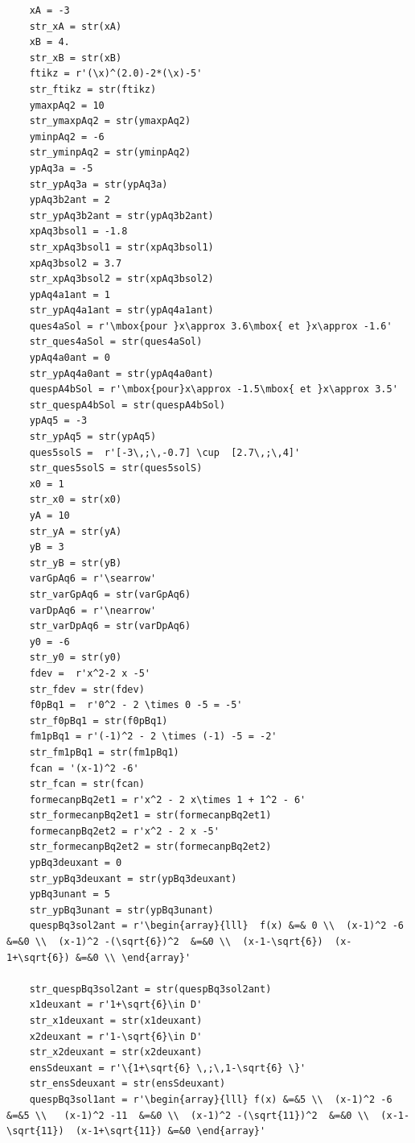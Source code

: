 {\begin{verbatim}
    xA = -3 
    str_xA = str(xA) 
    xB = 4. 
    str_xB = str(xB) 
    ftikz = r'(\x)^(2.0)-2*(\x)-5' 
    str_ftikz = str(ftikz) 
    ymaxpAq2 = 10 
    str_ymaxpAq2 = str(ymaxpAq2) 
    yminpAq2 = -6 
    str_yminpAq2 = str(yminpAq2) 
    ypAq3a = -5 
    str_ypAq3a = str(ypAq3a) 
    ypAq3b2ant = 2 
    str_ypAq3b2ant = str(ypAq3b2ant) 
    xpAq3bsol1 = -1.8 
    str_xpAq3bsol1 = str(xpAq3bsol1) 
    xpAq3bsol2 = 3.7 
    str_xpAq3bsol2 = str(xpAq3bsol2) 
    ypAq4a1ant = 1 
    str_ypAq4a1ant = str(ypAq4a1ant) 
    ques4aSol = r'\mbox{pour }x\approx 3.6\mbox{ et }x\approx -1.6' 
    str_ques4aSol = str(ques4aSol) 
    ypAq4a0ant = 0 
    str_ypAq4a0ant = str(ypAq4a0ant) 
    quespA4bSol = r'\mbox{pour}x\approx -1.5\mbox{ et }x\approx 3.5' 
    str_quespA4bSol = str(quespA4bSol) 
    ypAq5 = -3 
    str_ypAq5 = str(ypAq5) 
    ques5solS =  r'[-3\,;\,-0.7] \cup  [2.7\,;\,4]' 
    str_ques5solS = str(ques5solS) 
    x0 = 1 
    str_x0 = str(x0) 
    yA = 10 
    str_yA = str(yA) 
    yB = 3 
    str_yB = str(yB) 
    varGpAq6 = r'\searrow'
    str_varGpAq6 = str(varGpAq6) 
    varDpAq6 = r'\nearrow' 
    str_varDpAq6 = str(varDpAq6) 
    y0 = -6 
    str_y0 = str(y0) 
    fdev =  r'x^2-2 x -5' 
    str_fdev = str(fdev) 
    f0pBq1 =  r'0^2 - 2 \times 0 -5 = -5'  
    str_f0pBq1 = str(f0pBq1) 
    fm1pBq1 = r'(-1)^2 - 2 \times (-1) -5 = -2' 
    str_fm1pBq1 = str(fm1pBq1) 
    fcan = '(x-1)^2 -6' 
    str_fcan = str(fcan) 
    formecanpBq2et1 = r'x^2 - 2 x\times 1 + 1^2 - 6' 
    str_formecanpBq2et1 = str(formecanpBq2et1) 
    formecanpBq2et2 = r'x^2 - 2 x -5'  
    str_formecanpBq2et2 = str(formecanpBq2et2) 
    ypBq3deuxant = 0 
    str_ypBq3deuxant = str(ypBq3deuxant) 
    ypBq3unant = 5 
    str_ypBq3unant = str(ypBq3unant) 
    quespBq3sol2ant = r'\begin{array}{lll}  f(x) &=& 0 \\  (x-1)^2 -6  &=&0 \\  (x-1)^2 -(\sqrt{6})^2  &=&0 \\  (x-1-\sqrt{6})  (x-1+\sqrt{6}) &=&0 \\ \end{array}'
 
    str_quespBq3sol2ant = str(quespBq3sol2ant) 
    x1deuxant = r'1+\sqrt{6}\in D' 
    str_x1deuxant = str(x1deuxant) 
    x2deuxant = r'1-\sqrt{6}\in D' 
    str_x2deuxant = str(x2deuxant) 
    ensSdeuxant = r'\{1+\sqrt{6} \,;\,1-\sqrt{6} \}' 
    str_ensSdeuxant = str(ensSdeuxant) 
    quespBq3sol1ant = r'\begin{array}{lll} f(x) &=&5 \\  (x-1)^2 -6  &=&5 \\   (x-1)^2 -11  &=&0 \\  (x-1)^2 -(\sqrt{11})^2  &=&0 \\  (x-1-\sqrt{11})  (x-1+\sqrt{11}) &=&0 \end{array}'
 

\end{verbatim}}
